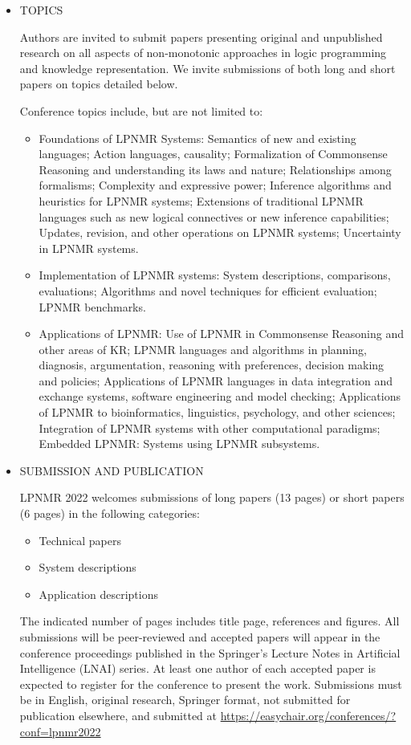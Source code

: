 \documentclass[prodmode,acmtecs]{acmsmall} %
\begin{document}
\begin{itemize}\item  TOPICS 
 
  Authors are invited to submit papers presenting original and unpublished research on all aspects of non-monotonic approaches in logic programming and knowledge representation. We invite submissions of both long and short papers on topics detailed below. 
 
  Conference topics include, but are not limited to: 
 
\begin{itemize}\item  Foundations of LPNMR Systems: Semantics of new and existing languages; Action languages, causality; Formalization of Commonsense Reasoning and understanding its laws and nature; Relationships among formalisms; Complexity and expressive power; Inference algorithms and heuristics for LPNMR systems; Extensions of traditional LPNMR languages such as new logical connectives or new inference capabilities; Updates, revision, and other operations on LPNMR systems; Uncertainty in LPNMR systems.
\item  Implementation of LPNMR systems: System descriptions, comparisons, evaluations; Algorithms and novel techniques for efficient evaluation; LPNMR benchmarks.
\item  Applications of LPNMR: Use of LPNMR in Commonsense Reasoning and other areas of KR; LPNMR languages and algorithms in planning, diagnosis, argumentation, reasoning with preferences, decision making and policies; Applications of LPNMR languages in data integration and exchange systems, software engineering and model checking; Applications of LPNMR to bioinformatics, linguistics, psychology, and other sciences; Integration of LPNMR systems with other computational paradigms; Embedded LPNMR: Systems using LPNMR subsystems. 
\end{itemize} 
\item  SUBMISSION AND PUBLICATION 
 
  LPNMR 2022 welcomes submissions of long papers (13 pages) or short papers (6 pages) in the following categories: 
 
\begin{itemize}\item  Technical papers 
\item  System descriptions 
\item  Application descriptions
\end{itemize} 
  The indicated number of pages includes title page, references and figures. All submissions will be peer-reviewed and accepted papers will appear in the conference proceedings published in the Springer's Lecture Notes in Artificial Intelligence (LNAI) series. At least one author of each accepted paper is expected to register for the conference to present the work. Submissions must be in English, original research, Springer format, not submitted for publication elsewhere, and submitted at \href{https://easychair.org/conferences/?conf=lpnmr2022}{https://easychair.org/conferences/?conf=lpnmr2022} 
 

\end{itemize}
\end{document}

